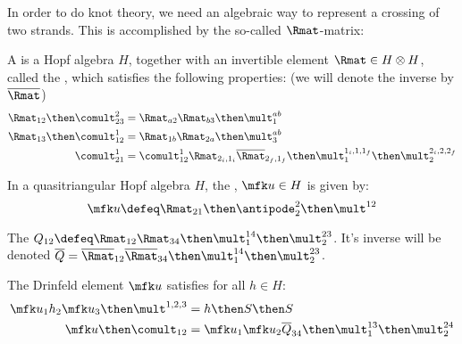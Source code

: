 \documentclass{article}
\begin{document}
In order to do knot theory, we need an algebraic way to represent a crossing of
two strands. This is accomplished by the so-called $\Rmat$-matrix:

\begin{definition}
A  is a Hopf algebra $H$, together with an
invertible element $\Rmat \in H\otimes H$, called the ,
which satisfies the following properties: (we will denote the inverse by
$\Rmati$)
\begin{align}
        \label{eq:Rmat_overstrand}
        \Rmat_{12}\then\comult^{2}_{23}&=\Rmat_{a2}\Rmat_{b3}\then\mult^{ab}_1\\
        \Rmat_{13}\then\comult^{1}_{12}&=\Rmat_{1b}\Rmat_{2a}\then\mult^{ab}_3\\
        \comult^{1}_{21} &= 
                \comult^{1}_{12} \Rmat_{2_i,1_i}\Rmati_{2_f,1_f}\then
                \mult^{1_i,1,1_f}_{1}\then \mult^{2_i,2,2_f}_{2}
\end{align}
\end{definition}

\begin{definition}
        In a quasitriangular Hopf algebra $H$, the ,
        $\dfe \in H$ is given by:
        \begin{equation}
                \dfe \defeq \Rmat_{21}\then\antipode^2_2 \then \mult^{12}
        \end{equation}
\end{definition}

\begin{definition}[monodromy]
        The 
        $\monodromy_{12} \defeq
        \Rmat_{12}\Rmat_{34}\then\mult^{14}_{1}\then\mult^{23}_{2}$. It's
        inverse will be denoted
        $\invb\monodromy =
        \Rmati_{12}\Rmati_{34}\then\mult^{14}_{1}\then\mult^{23}_{2}$.
\end{definition}

\begin{lemma}
        The Drinfeld element $\dfe$ satisfies for all $h\in H$:
        \begin{align}
                \dfe_{1}h_2\dfe_{3} \then \mult^{1,2,3}
                &= h \then S \then S\\
                \dfe \then \comult_{12} 
                &= \dfe_1\dfe_2\invb\monodromy_{34}
                \then\mult^{13}_{1}\then\mult^{24}_2
        \end{align}
\end{lemma}
\end{document}
